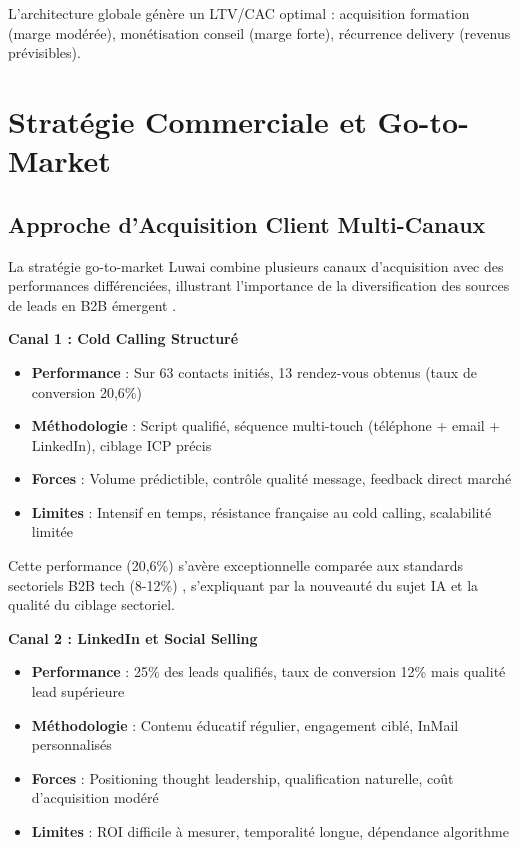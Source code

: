 L'architecture globale génère un LTV/CAC optimal : acquisition formation (marge modérée), monétisation conseil (marge forte), récurrence delivery (revenus prévisibles).

\section{Stratégie Commerciale et Go-to-Market}

\subsection{Approche d'Acquisition Client Multi-Canaux}

La stratégie go-to-market Luwai combine plusieurs canaux d'acquisition avec des performances différenciées, illustrant l'importance de la diversification des sources de leads en B2B émergent \cite{weinberg2015traction}.

\textbf{Canal 1 : Cold Calling Structuré}
\begin{itemize}
    \item \textbf{Performance} : Sur 63 contacts initiés, 13 rendez-vous obtenus (taux de conversion 20,6\%)
    \item \textbf{Méthodologie} : Script qualifié, séquence multi-touch (téléphone + email + LinkedIn), ciblage ICP précis
    \item \textbf{Forces} : Volume prédictible, contrôle qualité message, feedback direct marché
    \item \textbf{Limites} : Intensif en temps, résistance française au cold calling, scalabilité limitée
\end{itemize}

Cette performance (20,6\%) s'avère exceptionnelle comparée aux standards sectoriels B2B tech (8-12\%) \cite{salesforce2024benchmarks}, s'expliquant par la nouveauté du sujet IA et la qualité du ciblage sectoriel.

\textbf{Canal 2 : LinkedIn et Social Selling}
\begin{itemize}
    \item \textbf{Performance} : 25\% des leads qualifiés, taux de conversion 12\% mais qualité lead supérieure
    \item \textbf{Méthodologie} : Contenu éducatif régulier, engagement ciblé, InMail personnalisés
    \item \textbf{Forces} : Positioning thought leadership, qualification naturelle, coût d'acquisition modéré
    \item \textbf{Limites} : ROI difficile à mesurer, temporalité longue, dépendance algorithme
\end{itemize}


